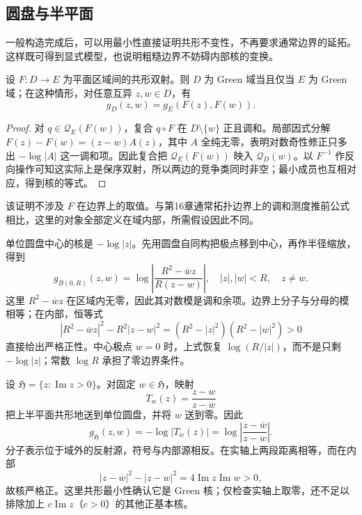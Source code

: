 \subsection{圆盘与半平面}
\label{b3:subsec:170303}

一般构造完成后，可以用最小性直接证明共形不变性，不再要求通常边界的延拓。这样既可得到显式模型，也说明粗糙边界不妨碍内部核的变换。

\begin{proposition}\label{b3:prop:17-general-conformal}
设 \(F:D\to E\) 为平面区域间的共形双射。则 \(D\) 为 Green 域当且仅当 \(E\) 为 Green 域；在这种情形，对任意互异 \(z,w\in D\)，有
\[
 g_D(z,w)=g_E(F(z),F(w)).
\]
\end{proposition}
\begin{proof}
对 \(q\in\mathcal Q_E(F(w))\)，复合 \(q\circ F\) 在 \(D\setminus\{w\}\) 正且调和。局部因式分解 \(F(z)-F(w)=(z-w)A(z)\)，其中 \(A\) 全纯无零，表明对数奇性修正只多出 \(-\log|A|\) 这一调和项。因此复合把 \(\mathcal Q_E(F(w))\) 映入 \(\mathcal Q_D(w)\)。以 \(F^{-1}\) 作反向操作可知这实际上是保序双射，所以两边的竞争类同时非空；最小成员也互相对应，得到核的等式。
\end{proof}

该证明不涉及 \(F\) 在边界上的取值。与第16章通常拓扑边界上的调和测度推前公式相比，这里的对象全部定义在域内部，所需假设因此不同。

\ProseParagraphBreak
单位圆盘中心的核是 \(-\log|z|\)。先用圆盘自同构把极点移到中心，再作半径缩放，得到
\begin{equation}\label{b3:eq:17-disk-green}
 g_{B(0,R)}(z,w)
 =\log\left|\frac{R^2-\overline wz}{R(z-w)}\right|,
 \quad |z|,|w|<R,\quad z\ne w.
\end{equation}
这里 \(R^2-\overline wz\) 在区域内无零，因此其对数模是调和余项。边界上分子与分母的模相等；在内部，恒等式
\[
 |R^2-\overline wz|^2-R^2|z-w|^2
 =(R^2-|z|^2)(R^2-|w|^2)>0
\]
直接给出严格正性。中心极点 \(w=0\) 时，上式恢复 \(\log(R/|z|)\)，而不是只剩 \(-\log|z|\)；常数 \(\log R\) 承担了零边界条件。

\ProseParagraphBreak
设 \(\mathfrak H=\{z:\operatorname{Im}z>0\}\)。对固定 \(w\in\mathfrak H\)，映射
\[
 T_w(z)=\frac{z-w}{z-\overline w}
\]
把上半平面共形地送到单位圆盘，并将 \(w\) 送到零。因此
\begin{equation}\label{b3:eq:17-halfplane-green}
 g_{\mathfrak H}(z,w)
 =-\log|T_w(z)|
 =\log\left|\frac{z-\overline w}{z-w}\right|.
\end{equation}
分子表示位于域外的反射源，符号与内部源相反。在实轴上两段距离相等，而在内部
\[
 |z-\overline w|^2-|z-w|^2
 =4\operatorname{Im}z\operatorname{Im}w>0,
\]
故核严格正。这里共形最小性确认它是 Green 核；仅检查实轴上取零，还不足以排除加上 \(c\operatorname{Im}z\)（\(c>0\)）的其他正基本核。

